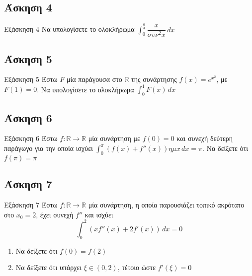 \documentclass[greek]{beamer}
\begin{document}
\subsection{Άσκηση 4}
\begin{frame}[label=Άσκηση4,t]{Εξάσκηση 4}
  Να υπολογίσετε το ολοκλήρωμα $\int_{0}^{\frac{0}{4}} \dfrac{x}{συν^2x} \,dx$

\end{frame}

\subsection{Άσκηση 5}
\begin{frame}[label=Άσκηση5,t]{Εξάσκηση 5}
  Έστω $F$ μία παράγουσα στο $\mathbb{R}$ της συνάρτησης $f(x)=e^{x^2}$, με $F(1)=0$. Να υπολογίσετε το ολοκλήρωμα $\int_{0}^{1} F(x) \,dx$

\end{frame}

\subsection{Άσκηση 6}
\begin{frame}[label=Άσκηση6,t]{Εξάσκηση 6}
  Έστω $f:\mathbb{R}\to\mathbb{R}$ μία συνάρτηση με $f(0)=0$ και συνεχή δεύτερη παράγωγο για την οποία ισχύει $\int_{0}^{π} \left( f(x)+f''(x) \right)ημx  \,dx=π$. Να δείξετε ότι $f(π)=π$

\end{frame}

\subsection{Άσκηση 7}
\begin{frame}[label=Άσκηση7,t]{Εξάσκηση 7}
  Έστω $f:\mathbb{R}\to\mathbb{R}$ μία συνάρτηση, η οποία παρουσιάζει τοπικό ακρότατο στο $x_0=2$, έχει συνεχή $f''$ και ισχύει
  $$\int_{0}^{2} \left( xf''(x)+2f'(x) \right) \,dx=0$$
  \begin{enumerate}
    \item<1-> Να δείξετε ότι $f(0)=f(2)$
    \item<2-> Να δείξετε ότι υπάρχει $ξ\in (0,2)$, τέτοιο ώστε $f'(ξ)=0$
  \end{enumerate}

\end{frame}
\end{document}
